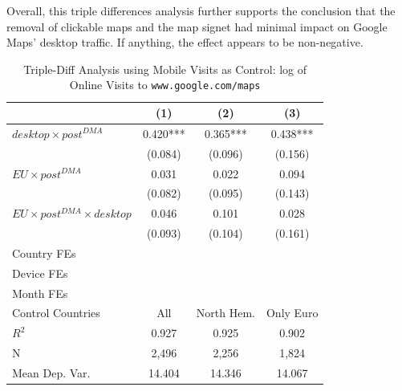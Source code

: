 \documentclass[11pt]{article}
\begin{document}
	Overall, this triple differences analysis further supports the conclusion that the removal of clickable maps and the map signet had minimal impact on Google Maps' desktop traffic. If anything, the effect appears to be non-negative.
	
	
	
	\begin{table}[ht!]
		\centering
		\def\sym#1{\ifmmode^{#1}\else\(^{#1}\)\fi}
		\caption{\label{tab:3_diff_gmaps} Triple-Diff Analysis using Mobile Visits as Control: log of Online Visits to \texttt{www.google.com/maps}}
		\begin{threeparttable}
			\begin{tabular}{lccc}
				\hline 
				
				&         (1)   &         (2)   &         (3)   \\
				\midrule
				$ desktop \times post^{DMA}  $ &       0.420***&       0.365***&       0.438***\\
				&     (0.084)   &     (0.096)   &     (0.156)   \\
				$ EU \times post^{DMA}$ &       0.031   &       0.022   &       0.094   \\
				&     (0.082)   &     (0.095)   &     (0.143)   \\
				$ EU \times post^{DMA} \times desktop $ &       0.046   &       0.101   &       0.028   \\
				&     (0.093)   &     (0.104)   &     (0.161)   \\
				
				Country FEs         &  \checkmark   &  \checkmark   &  \checkmark   \\
				Device FEs          &  \checkmark   &  \checkmark   &  \checkmark   \\
				Month FEs           &  \checkmark   &  \checkmark   &  \checkmark   \\
				Control Countries   &         All   &  North Hem.   &   Only Euro   \\
				$ R ^2 $            &       0.927   &       0.925   &       0.902   \\
				N                   &       2,496   &       2,256   &       1,824   \\
				Mean Dep. Var.      &      14.404   &      14.346   &      14.067   \\
				\midrule
				
			\end{tabular}
			

\end{threeparttable}
\end{table}
\end{document}
